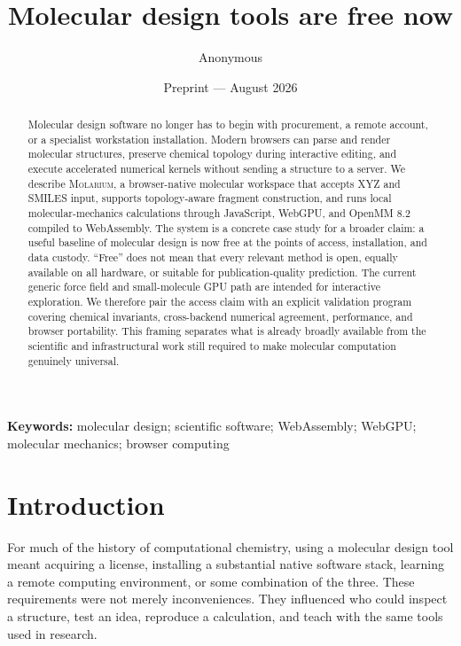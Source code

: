\documentclass[11pt]{article}
\title{Molecular design tools are free now}
\author{Anonymous}
\date{Preprint --- August 2026}
\newcommand{\molarium}{\textsc{Molarium}}
\newif\ifdraft
\newcommand{\draftnote}[1]{%
  \ifdraft
    \par\noindent
    \colorbox{yellow!20}{%
      \parbox{\dimexpr\linewidth-2\fboxsep\relax}{%
        \textbf{Draft note:} #1%
      }%
    }%
    \par
  \fi
}
\begin{document}
\maketitle

\begin{abstract}
Molecular design software no longer has to begin with procurement, a remote
account, or a specialist workstation installation.
Modern browsers can parse and render molecular structures, preserve chemical
topology during interactive editing, and execute accelerated numerical kernels
without sending a structure to a server.
We describe \molarium, a browser-native molecular workspace that accepts XYZ and
SMILES input, supports topology-aware fragment construction, and runs local
molecular-mechanics calculations through JavaScript, WebGPU, and OpenMM 8.2
compiled to WebAssembly.
The system is a concrete case study for a broader claim: a useful baseline of
molecular design is now free at the points of access, installation, and data
custody.
``Free'' does not mean that every relevant method is open, equally available on
all hardware, or suitable for publication-quality prediction.
The current generic force field and small-molecule GPU path are intended for
interactive exploration.
We therefore pair the access claim with an explicit validation program covering
chemical invariants, cross-backend numerical agreement, performance, and browser
portability.
This framing separates what is already broadly available from the scientific and
infrastructural work still required to make molecular computation genuinely
universal.
\end{abstract}

\noindent\textbf{Keywords:}
molecular design; scientific software; WebAssembly; WebGPU; molecular mechanics;
browser computing

\draftnote{Replace the author metadata and decide whether this is primarily a
  software paper, a perspective, or an empirical access study. The present draft
  treats \molarium{} as a case study inside a broader position paper.}

\section{Introduction}
\label{sec:introduction}

For much of the history of computational chemistry, using a molecular design
tool meant acquiring a license, installing a substantial native software stack,
learning a remote computing environment, or some combination of the three.
These requirements were not merely inconveniences.
They influenced who could inspect a structure, test an idea, reproduce a
calculation, and teach with the same tools used in research.
\end{document}

